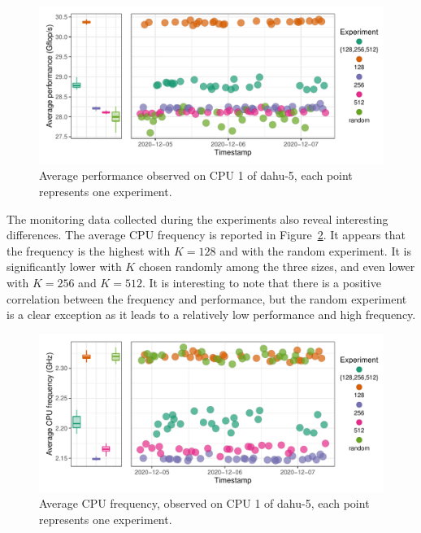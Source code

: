             \begin{figure}[htpb]
                \centering
                \includegraphics[width=1\linewidth]{img/experiment/randomizing_sizes/fixing_K/average_performance.pdf}
                \caption{Average \dgemm performance observed on CPU 1 of dahu-5, each point represents one experiment.}%
                \label{fig:randomizing_sizes:expfile:fixing_K:performance}
            \end{figure}

            The monitoring data collected during the experiments also reveal interesting differences. The average CPU
            frequency is reported in Figure~\ref{fig:randomizing_sizes:expfile:fixing_K:frequency}. It appears that the
            frequency is the highest with \(K=128\) and with the random experiment. It is significantly lower with \(K\)
            chosen randomly among the three sizes, and even lower with \(K=256\) and \(K=512\). It is interesting to
            note that there is a positive correlation between the frequency and \dgemm performance, but the random
            experiment is a clear exception as it leads to a relatively low performance and high frequency.

            \begin{figure}[htpb]
                \centering
                \includegraphics[width=1\linewidth]{img/experiment/randomizing_sizes/fixing_K/average_frequency.pdf}
                \caption{Average CPU frequency, observed on CPU 1 of dahu-5, each point represents one experiment.}%
                \label{fig:randomizing_sizes:expfile:fixing_K:frequency}
            \end{figure}

